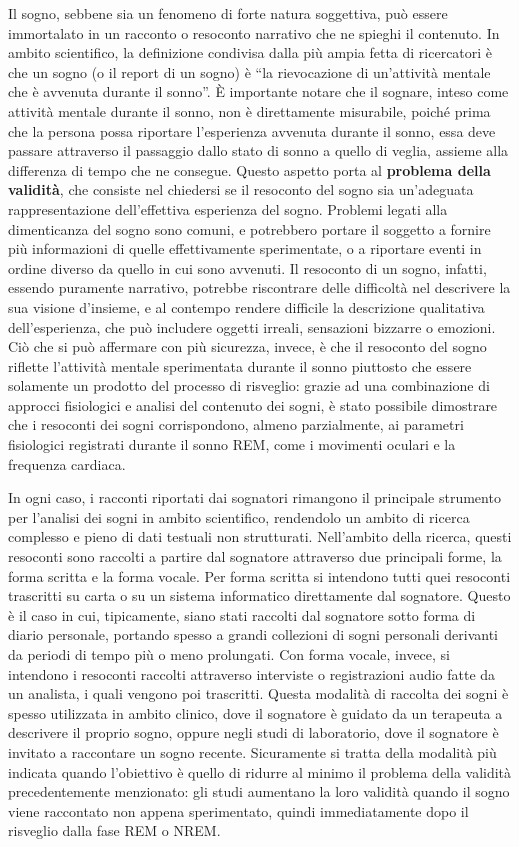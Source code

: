Il sogno, sebbene sia un fenomeno di forte natura soggettiva, può essere immortalato in un racconto o resoconto
narrativo che ne spieghi il contenuto.
In ambito scientifico, la definizione condivisa dalla più ampia fetta di ricercatori è che un sogno
(o il report di un sogno) è ``la rievocazione di un'attività mentale che è avvenuta durante il sonno''.
\`E importante notare che il sognare, inteso come attività mentale durante il sonno, non è direttamente misurabile,
poiché prima che la persona possa riportare l'esperienza avvenuta durante il sonno, essa
deve passare attraverso il passaggio dallo stato di sonno a quello di veglia, assieme alla differenza di tempo
che ne consegue.
Questo aspetto porta al \textbf{problema della validità}, che consiste nel chiedersi se il resoconto del sogno sia
un'adeguata rappresentazione dell'effettiva esperienza del sogno.
Problemi legati alla dimenticanza del sogno sono comuni, e potrebbero portare il soggetto a fornire più informazioni
di quelle effettivamente sperimentate, o a riportare eventi in ordine diverso da quello in cui sono avvenuti.
Il resoconto di un sogno, infatti, essendo puramente narrativo, potrebbe riscontrare delle difficoltà nel
descrivere la sua visione d'insieme, e al contempo rendere difficile la descrizione qualitativa dell'esperienza,
che può includere oggetti irreali, sensazioni bizzarre o emozioni.
Ciò che si può affermare con più sicurezza, invece, è che il resoconto del sogno riflette l'attività mentale
sperimentata durante il sonno piuttosto che essere solamente un prodotto del processo di risveglio: grazie ad una
combinazione di approcci fisiologici e analisi del contenuto dei sogni, è stato possibile dimostrare che i
resoconti dei sogni corrispondono, almeno parzialmente, ai parametri fisiologici registrati durante il sonno REM, come i
movimenti oculari e la frequenza cardiaca.

In ogni caso, i racconti riportati dai sognatori rimangono il principale strumento per l'analisi dei sogni
in ambito scientifico, rendendolo un ambito di ricerca complesso e pieno di dati testuali non strutturati.
Nell'ambito della ricerca, questi resoconti sono raccolti a partire dal sognatore attraverso due principali
forme, la forma scritta e la forma vocale.
Per forma scritta si intendono tutti quei resoconti trascritti su carta o su un sistema informatico
direttamente dal sognatore.
Questo è il caso in cui, tipicamente, siano stati raccolti dal sognatore sotto forma di diario personale,
portando spesso a grandi collezioni di sogni personali derivanti da periodi di tempo più o meno prolungati.
Con forma vocale, invece, si intendono i resoconti raccolti attraverso interviste o registrazioni audio fatte
da un analista, i quali vengono poi trascritti.
Questa modalità di raccolta dei sogni è spesso utilizzata in ambito clinico, dove il sognatore è guidato da un
terapeuta a descrivere il proprio sogno, oppure negli studi di laboratorio, dove il sognatore è invitato
a raccontare un sogno recente.
Sicuramente si tratta della modalità più indicata quando l'obiettivo è quello di ridurre al minimo il problema
della validità precedentemente menzionato: gli studi aumentano la loro validità quando il sogno viene raccontato
non appena sperimentato, quindi immediatamente dopo il risveglio dalla fase REM o NREM\@.

